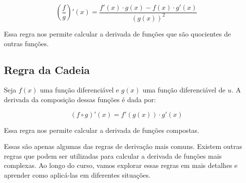 \documentclass[12pt]{article}
\begin{document}
\[
\left(\frac{f}{g}\right)'(x) = \frac{f'(x) \cdot g(x) - f(x) \cdot g'(x)}{(g(x))^2}
\]

Essa regra nos permite calcular a derivada de funções que são quocientes de outras funções.

\subsection{Regra da Cadeia}

Seja $f(x)$ uma função diferenciável e $g(x)$ uma função diferenciável de $u$. A derivada da composição dessas funções é dada por:

\[
(f \circ g)'(x) = f'(g(x)) \cdot g'(x)
\]

Essa regra nos permite calcular a derivada de funções compostas.

Essas são apenas algumas das regras de derivação mais comuns. Existem outras regras que podem ser utilizadas para calcular a derivada de funções mais complexas. Ao longo do curso, vamos explorar essas regras em mais detalhes e aprender como aplicá-las em diferentes situações.
\end{document}
